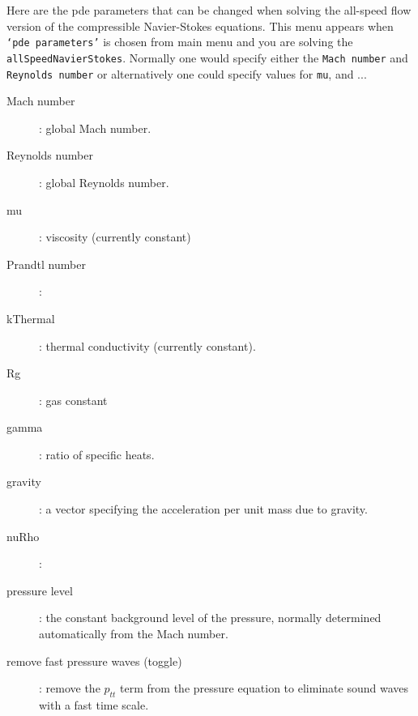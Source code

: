  Here are the pde parameters that can be changed when solving the all-speed flow version of the
  compressible Navier-Stokes equations.
 This menu appears when {\tt `pde parameters'} is chosen from main menu and you are solving the 
  {\tt allSpeedNavierStokes}. 
 Normally one would specify either the {\tt Mach number} and {\tt Reynolds number}
  or alternatively one could specify values for {\tt mu}, and ...
\begin{description}
  \item[Mach number] : global Mach number.
  \item[Reynolds number] : global Reynolds number.
  \item[mu] : viscosity (currently constant)
  \item[Prandtl number] : 
  \item[kThermal] : thermal conductivity (currently constant).
  \item[Rg] : gas constant
  \item[gamma] : ratio of specific heats.
  \item[gravity] : a vector specifying the acceleration per unit mass due to gravity.
  \item[nuRho] :
  \item[pressure level] : the constant background level of the pressure, normally determined automatically
     from the Mach number.
  \item[remove fast pressure waves (toggle)] : remove the $p_{tt}$ term from the pressure equation to
       eliminate sound waves with a fast time scale.
 \end{description}

